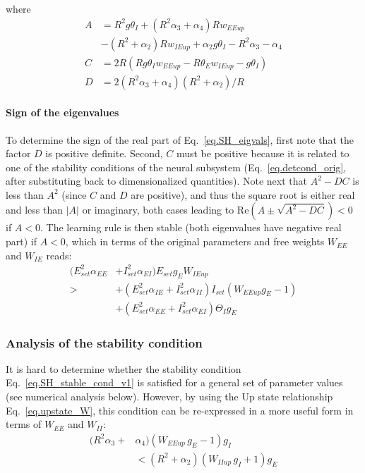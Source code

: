 \documentclass[twocolumn]{article}
\newcommand{\EE}{\mathit{EE}}
\newcommand{\EI}{\mathit{EI}}
\newcommand{\IE}{\mathit{IE}}
\newcommand{\II}{\mathit{II}}
\newcommand{\set}{\mathit{set}}
\newcommand{\up}{\mathit{up}}
\newcommand{\RE}{\mathrm{Re}}
\begin{document}
\noindent where
\begin{equation}
\begin{aligned}
A & = R^2 g \theta_I + (R^2 \alpha_3 + \alpha_4) R w_{\EE\up} \\
& - (R^2 + \alpha_2)R w_{\IE\up} + \alpha_2 g \theta_I - R^2 \alpha_3 - \alpha_4 \\
C & = 2R(R g \theta_I w_{\EE\up} - R \theta_E w_{\IE\up} - g \theta_I) \\
D & = 2(R^2\alpha_3 + \alpha_4)(R^2 + \alpha_2)/R
\end{aligned}
\end{equation}


\paragraph{Sign of the eigenvalues}

To determine the sign of the real part of Eq.\ \ref{eq.SH_eigvals}, first note that the factor $D$ is positive definite. Second, $C$ must be positive because it is related to one of the stability conditions of the neural subsystem (Eq.\ \ref{eq.detcond_orig}, after substituting back to dimensionalized quantities). Note next that $A^2 - DC$ is less than $A^2$ (since $C$ and $D$ are positive), and thus the square root is either real and less than $|A|$ or imaginary, both cases leading to $\RE(A \pm \sqrt{A^2-DC}) < 0$ if $A<0$. The learning rule is then stable (both eigenvalues have negative real part) if $A<0$, which in terms of the original parameters and free weights $W_{\EE}$ and $W_{\IE}$ reads:
\begin{equation}
\begin{aligned}
(E_{\set}^2 \alpha_{\EE} & + I_{\set}^2 \alpha_{\EI}) E_{\set} g_E W_{\IE\up} \\
> & + (E_{\set}^2 \alpha_{\IE} + I_{\set}^2 \alpha_{\II}) I_{\set}(W_{\EE\up} g_E - 1) \\
& + (E_{\set}^2 \alpha_{\EE} + I_{\set}^2 \alpha_{\EI}) \Theta_I g_E
\end{aligned}
\label{eq.SH_stable_cond_v1}
\end{equation}


\subsubsection{Analysis of the stability condition}

It is hard to determine whether the stability condition Eq.\ \ref{eq.SH_stable_cond_v1} is satisfied for a general set of parameter values (see numerical analysis below). However, by using the Up state relationship Eq.\ \ref{eq.upstate_W}, this condition can be re-expressed in a more useful form in terms of $W_{\EE}$ and $W_{\II}$:
\begin{equation}
\begin{aligned}
(R^2 \alpha_3 + & \alpha_4)(W_{\EE\up} \, g_E  - 1)g_I \\
& < (R^2 + \alpha_2)(W_{\II\up} \, g_I + 1)g_E
\end{aligned}
\label{eq.SH_stable_cond_v2}
\end{equation}
\end{document}

